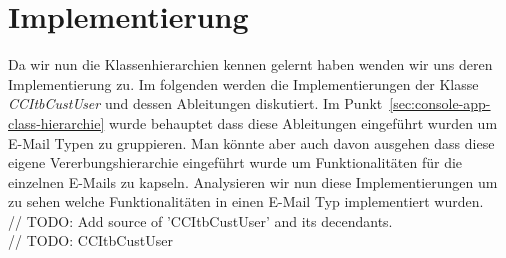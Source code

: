 \newpage
\section{Implementierung}
Da wir nun die Klassenhierarchien kennen gelernt haben wenden wir uns deren Implementierung zu. Im folgenden werden die Implementierungen der Klasse \emph{CCItbCustUser} und dessen Ableitungen diskutiert. Im Punkt~\ref{sec:console-app-class-hierarchie} wurde behauptet dass diese Ableitungen eingeführt wurden um E-Mail Typen zu gruppieren. Man könnte aber auch davon ausgehen dass diese eigene Vererbungshierarchie eingeführt wurde um Funktionalitäten für die einzelnen E-Mails zu kapseln. Analysieren wir nun diese Implementierungen um zu sehen welche Funktionalitäten in einen E-Mail Typ implementiert wurden. \\



// TODO: Add source of 'CCItbCustUser' and its decendants. \\
// TODO: CCItbCustUser \\\\


\newpage

